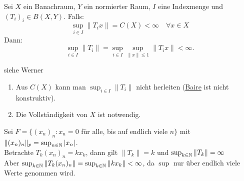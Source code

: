 \begin{satz} \label{satz:9.5-Banach-Steinhaus} 
	Sei $X$ ein Banachraum, $Y$ ein normierter Raum, $I$ eine Indexmenge und $(T_{i})_{i} \in B(X, Y)$.
	Falls: 
	\[ \sup_{i \in I} \| T_{i} x \| = C(X) < \infty \quad \forall x \in X \]
	Dann:
	\[ \sup_{i \in I} \| T_{i} \| = \sup_{i \in I} \sup_{\| x \| \leq 1} \| T_{i} x \| < \infty. \]
\end{satz}

\begin{beweis}
	siehe Werner %
\end{beweis}


\begin{bemerkung}  \label{bem:9.6}
	\begin{enumerate}[label=\alph*\upshape)]
		\item Aus $C(X)$ kann man $\sup_{i \in I} \| T_{i} \|$ nicht herleiten (\hyperref[satz:9.3-KategoriensatzVonBaire]{Baire} ist nicht konstruktiv).
		\item Die Vollständigkeit von $X$ ist notwendig.
	\end{enumerate}	
\end{bemerkung}


\begin{beispiel*}
Sei $F = \{ (x_{n})_{n}: x_{n} = 0$ für alle, bis auf endlich viele $n \}$ mit $\| (x_{n})_{n} \|_{p} = \sup_{n \in \mathbb{N}} | x_{n} |$. \\
Betrachte $T_{k} (x_{n})_{n} = k x_{k}$, dann gilt $\| T_{k} \| = k$ und $\sup_{k \in \mathbb{N}} \| T_{k} \| = \infty$ \\
Aber $\sup_{k \in \mathbb{N}} \| T_{k} (x_{n})_{n} \| = \sup_{k \in \mathbb{N}} \| k x_{k} \| < \infty$, da $\sup$ nur über endlich viele Werte genommen wird.
\end{beispiel*}


